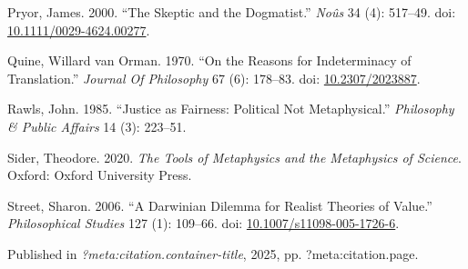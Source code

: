 \documentclass[
  10pt,
  letterpaper,
  DIV=11,
  numbers=noendperiod,
  twoside]{scrartcl}
\newlength{\cslhangindent}
\newenvironment{CSLReferences}[2] %
 {\begin{list}{}{%
  \setlength{\itemindent}{0pt}
  \setlength{\leftmargin}{0pt}
  \setlength{\parsep}{0pt}
  \ifodd #1
   \setlength{\leftmargin}{\cslhangindent}
   \setlength{\itemindent}{-1\cslhangindent}
  \fi
  \setlength{\itemsep}{#2\baselineskip}}}
 {\end{list}}
\begin{document}
\begin{CSLReferences}{1}{0}
Pryor, James. 2000. {``The Skeptic and the Dogmatist.''} \emph{Noûs} 34
(4): 517--49. doi:
\href{https://doi.org/10.1111/0029-4624.00277}{10.1111/0029-4624.00277}.

Quine, Willard van Orman. 1970. {``On the Reasons for Indeterminacy of
Translation.''} \emph{Journal Of Philosophy} 67 (6): 178--83. doi:
\href{https://doi.org/10.2307/2023887}{10.2307/2023887}.

Rawls, John. 1985. {``Justice as Fairness: Political Not
Metaphysical.''} \emph{Philosophy \& Public Affairs} 14 (3): 223--51.

Sider, Theodore. 2020. \emph{The Tools of Metaphysics and the
Metaphysics of Science}. Oxford: Oxford University Press.

Street, Sharon. 2006. {``A Darwinian Dilemma for Realist Theories of
Value.''} \emph{Philosophical Studies} 127 (1): 109--66. doi:
\href{https://doi.org/10.1007/s11098-005-1726-6}{10.1007/s11098-005-1726-6}.

\end{CSLReferences}



\noindent Published in\emph{
?meta:citation.container-title}, 2025, pp. ?meta:citation.page.
\end{document}
